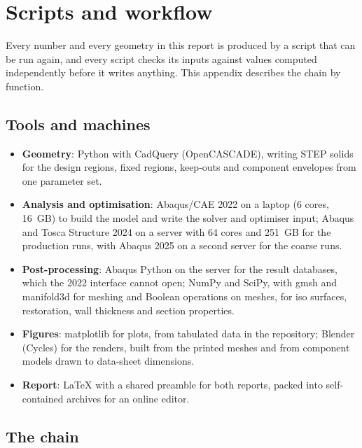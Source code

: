 \chapter{Scripts and workflow}\label{sec:workflow}

Every number and every geometry in this report is produced by a script that can be run again, and every script checks its inputs against values computed independently before it writes anything. This appendix describes the chain by function.

\section{Tools and machines}\label{sec:wf-tools}

\begin{itemize}
\item \textbf{Geometry}: Python with CadQuery (OpenCASCADE), writing STEP solids for the design regions, fixed regions, keep-outs and component envelopes from one parameter set.
\item \textbf{Analysis and optimisation}: Abaqus/CAE 2022 on a laptop (6 cores, \SI{16}{GB}) to build the model and write the solver and optimiser input; Abaqus and Tosca Structure 2024 on a server with 64 cores and \SI{251}{GB} for the production runs, with Abaqus 2025 on a second server for the coarse runs.
\item \textbf{Post-processing}: Abaqus Python on the server for the result databases, which the 2022 interface cannot open; NumPy and SciPy, with gmsh and manifold3d for meshing and Boolean operations on meshes, for iso surfaces, restoration, wall thickness and section properties.
\item \textbf{Figures}: matplotlib for plots, from tabulated data in the repository; Blender (Cycles) for the renders, built from the printed meshes and from component models drawn to data-sheet dimensions.
\item \textbf{Report}: \LaTeX{} with a shared preamble for both reports, packed into self-contained archives for an online editor.
\end{itemize}

\section{The chain}\label{sec:wf-chain}

